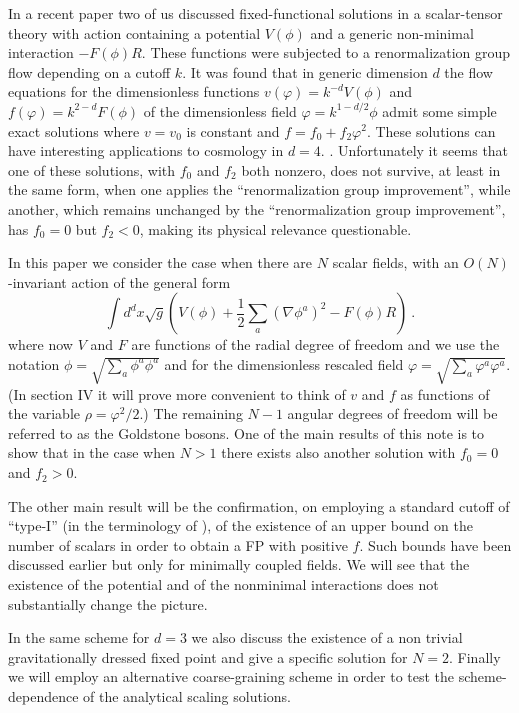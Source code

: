 \documentclass[a4paper,11pt]{revtex4}
\newcommand{\be}{\begin{equation}}
\newcommand{\ee}{\end{equation}}
\begin{document}
In a recent paper \cite{pv1} two of us discussed 
fixed-functional solutions
in a scalar-tensor theory with action containing a potential $V(\phi)$
and a generic non-minimal interaction $-F(\phi)R$.
These functions were subjected to a renormalization group flow
depending on a cutoff $k$.
It was found that in generic dimension $d$ the flow equations for the dimensionless
functions $v(\varphi)=k^{-d}V(\phi)$ and $f(\varphi)=k^{2-d}F(\phi)$
of the dimensionless field $\varphi=k^{1-d/2}\phi$
admit some simple exact solutions where $v=v_0$ is constant and
$f=f_0+f_2\varphi^2$.
These solutions can have interesting applications to cosmology in $d=4$.
\cite{hprw}.
Unfortunately it seems that one of these solutions,
with $f_0$ and $f_2$ both nonzero, does not survive,
at least in the same form, when one applies the
``renormalization group improvement'',
while another, which remains unchanged by the
``renormalization group improvement'',
has $f_0=0$ but $f_2<0$, making its physical relevance questionable.

In this paper we consider the case when 
there are $N$ scalar fields, with an $O(N)$-invariant
action of the general form
\be
\label{action}
\int d^dx\sqrt{g}\left(V(\phi)
+\frac{1}{2}\sum_a(\nabla\phi^a)^2-F(\phi)R\right)\ .
\ee
where now $V$ and $F$ are functions of the radial degree of freedom
and we use the notation $\phi=\sqrt{\sum_a \phi^a\phi^a}$ and for the dimensionless rescaled field
$\varphi=\sqrt{\sum_a \varphi^a\varphi^a}$.
(In section IV it will prove more convenient to think of
$v$ and $f$ as functions of the variable $\rho=\varphi^2/2$.)
The remaining $N-1$ angular degrees
of freedom will be referred to as the Goldstone bosons.
One of the main results of this note is to show that in the case
when $N>1$ there exists also another solution with $f_0=0$ and $f_2>0$.

The other main result will be the confirmation, 
on employing a standard cutoff of ``type-I''
(in the terminology of \cite{cpr2}),
of the existence  of an upper bound on the number of scalars in order to obtain a FP with positive $f$.
Such bounds have been discussed earlier but only for minimally 
coupled fields.
We will see that the existence of the potential and of the nonminimal interactions does not substantially change the picture.

In the same scheme for $d=3$ we also discuss the existence 
of a non trivial gravitationally dressed fixed point 
and give a specific solution for $N=2$.
Finally we will employ an alternative coarse-graining scheme
in order to test the scheme-dependence of the analytical scaling solutions. 
\end{document}
